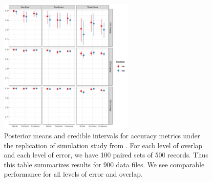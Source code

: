 \documentclass[ba]{imsart}
\begin{document}
	
	
	\begin{figure}[t]
		\begin{center}
			\includegraphics[width=0.6\textwidth]{../notes/figures/sadinle_sim_plot2} 
			\caption{Posterior means and credible intervals for accuracy metrics under the replication of simulation study from \cite{sadinle_bayesian_2017}. For each level of overlap and each level of error, we have 100 paired sets of 500 records. Thus this table summarizes results for 900 data files. We see comparable performance for all levels of error and overlap.}
			\label{fig:sadinle_simulation}
		\end{center}
	\end{figure}
	
\end{document}
